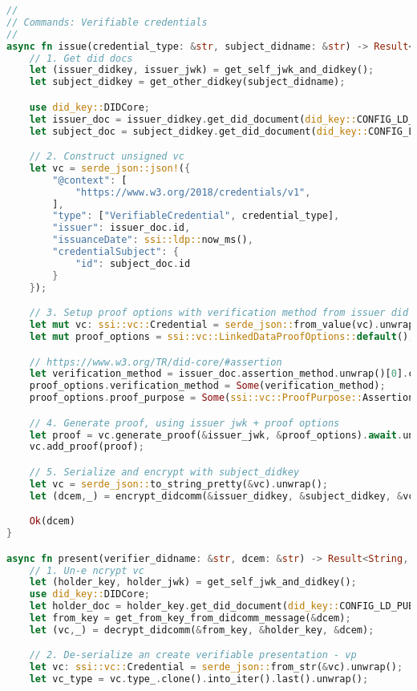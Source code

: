 \begin{lstlisting}[language=Rust]
//
// Commands: Verifiable credentials
//
async fn issue(credential_type: &str, subject_didname: &str) -> Result<String, std::io::Error> {
    // 1. Get did docs
    let (issuer_didkey, issuer_jwk) = get_self_jwk_and_didkey();
    let subject_didkey = get_other_didkey(subject_didname);

    use did_key::DIDCore;
    let issuer_doc = issuer_didkey.get_did_document(did_key::CONFIG_LD_PUBLIC);
    let subject_doc = subject_didkey.get_did_document(did_key::CONFIG_LD_PUBLIC);

    // 2. Construct unsigned vc
    let vc = serde_json::json!({
        "@context": [
            "https://www.w3.org/2018/credentials/v1",
        ],
        "type": ["VerifiableCredential", credential_type],
        "issuer": issuer_doc.id,
        "issuanceDate": ssi::ldp::now_ms(),
        "credentialSubject": {
            "id": subject_doc.id
        }
    });

    // 3. Setup proof options with verification method from issuer did doc
    let mut vc: ssi::vc::Credential = serde_json::from_value(vc).unwrap();
    let mut proof_options = ssi::vc::LinkedDataProofOptions::default();

    // https://www.w3.org/TR/did-core/#assertion
    let verification_method = issuer_doc.assertion_method.unwrap()[0].clone();
    proof_options.verification_method = Some(verification_method);
    proof_options.proof_purpose = Some(ssi::vc::ProofPurpose::AssertionMethod);

    // 4. Generate proof, using issuer jwk + proof options
    let proof = vc.generate_proof(&issuer_jwk, &proof_options).await.unwrap();
    vc.add_proof(proof);

    // 5. Serialize and encrypt with subject_didkey
    let vc = serde_json::to_string_pretty(&vc).unwrap();
    let (dcem,_) = encrypt_didcomm(&issuer_didkey, &subject_didkey, &vc.clone());

    Ok(dcem)
}

async fn present(verifier_didname: &str, dcem: &str) -> Result<String, std::io::Error> {
    // 1. Un-e ncrypt vc
    let (holder_key, holder_jwk) = get_self_jwk_and_didkey();
    use did_key::DIDCore;
    let holder_doc = holder_key.get_did_document(did_key::CONFIG_LD_PUBLIC);
    let from_key = get_from_key_from_didcomm_message(&dcem);
    let (vc,_) = decrypt_didcomm(&from_key, &holder_key, &dcem);

    // 2. De-serialize an create verifiable presentation - vp
    let vc: ssi::vc::Credential = serde_json::from_str(&vc).unwrap();
    let vc_type = vc.type_.clone().into_iter().last().unwrap();


\end{lstlisting}
